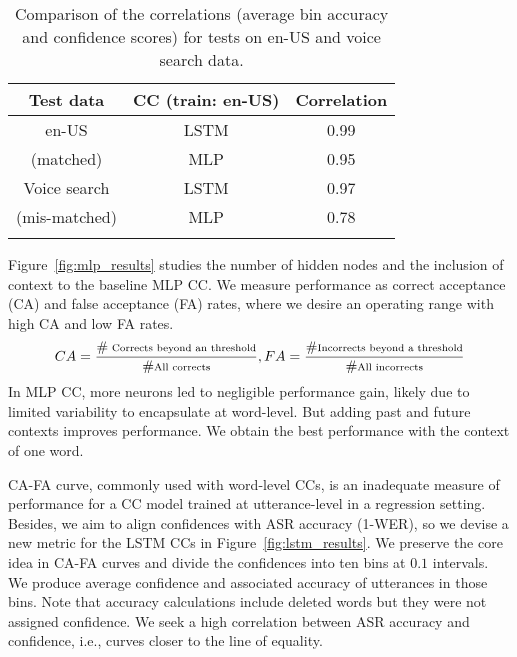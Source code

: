 \documentclass[a4paper]{article}
\begin{document}
\begin{table}[b]
\begin{scriptsize}
\begin{center}
\vspace{-2em}
\caption{Comparison of the correlations (average bin accuracy and confidence scores) for tests on en-US and voice search data.} \label{tab:correlation}
\begin{tabular}{ccc}
\toprule
\textbf{Test data}            & \textbf{CC (train: en-US)} & \textbf{Correlation} \\
\midrule
\midrule
en-US        & LSTM        & 0.99            \\
     (matched)                         & MLP         & 0.95            \\
                              \midrule
Voice search & LSTM        & 0.97            \\
            (mis-matched)                  & MLP         & 0.78           \\
\bottomrule
\vspace{-3em}
\end{tabular}%
\end{center}
\end{scriptsize}
\end{table}
Figure~\ref{fig:mlp_results} studies the number of hidden nodes and the inclusion of context to the baseline MLP CC. We measure performance as correct acceptance (CA) and false acceptance (FA) rates, where we desire an operating range with high CA and low FA rates. 
\begin{equation*}
\scriptsize{
   CA = \frac{\#\text{ Corrects beyond an threshold}}{\#\text{All corrects}},
FA = \frac{\#\text{Incorrects beyond a threshold}}{\#\text{All incorrects}}  
}
\end{equation*}
In MLP CC, more neurons led to negligible performance gain, likely due to limited variability to encapsulate at word-level. But adding past and future contexts improves performance. We obtain the best performance with the context of one word. 

CA-FA curve, commonly used with word-level CCs, is an inadequate measure of performance for a CC model trained at utterance-level in a regression setting. Besides, we aim to align confidences with ASR accuracy (1-WER), so we devise a new metric for the LSTM CCs in Figure~\ref{fig:lstm_results}. We preserve the core idea in CA-FA curves and divide the confidences into ten bins at $0.1$ intervals. We produce average confidence and associated accuracy of utterances in those bins. Note that accuracy calculations include deleted words but they were not assigned confidence. We seek a high correlation between ASR accuracy and confidence, i.e., curves closer to the line of equality. 
\end{document}
